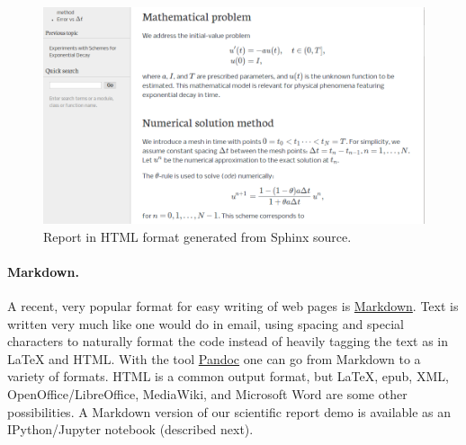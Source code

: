 \documentclass[%
oneside,                 %
final,                   %
10pt]{article}
\begin{document}
\begin{figure}[!ht]  %
  \centerline{\includegraphics[width=0.9\linewidth]{fig-softeng/report_sphinx.png}}
  \caption{
  Report in HTML format generated from Sphinx source. \label{softeng1:exper:report:fig:sphinx}
  }
\end{figure}



\paragraph{Markdown.}
A recent, very popular format for easy writing of web pages is
\href{{http://daringfireball.net/projects/markdown/}}{Markdown}.
Text is written very much like one would do in email, using
spacing and special characters to naturally format the code
instead of heavily tagging the text as in {\LaTeX} and HTML.
With the tool \href{{http://johnmacfarlane.net/pandoc/}}{Pandoc} one
can go from Markdown to a variety of formats.
HTML is a common output format, but {\LaTeX}, epub, XML,
OpenOffice/LibreOffice, MediaWiki, and Microsoft Word are some other
possibilities. A Markdown version of our scientific
report demo is available as an IPython/Jupyter notebook (described next).

\end{document}
